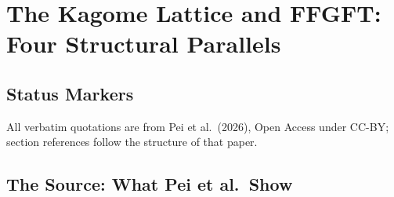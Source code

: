 
\providecommand{\BM}{\textbf{[B]}}
\providecommand{\KM}{\textbf{[K]}}
\providecommand{\SM}{\textbf{[S]}}
\providecommand{\SetzM}{\textbf{[SETZUNG]}}
\providecommand{\QM}{\textbf{[Q]}}

\chapter*{The Kagome Lattice and FFGFT: Four Structural Parallels}

\begin{abstract}
Pei, Chen, Castelnovo and Moessner (PRL~137, 106702, 31~August 2026, Open
Access) study the singly doped infinite-$U$ Hubbard model on the kagome
lattice. They find resonating-valence-bond (RVB) polarons, disorder-free
self-trapping with band mass increasing by six orders of magnitude, and a
crossover to $\sqrt{3}\times\sqrt{3}$ order in the unpolarised limit, which
they benchmark against the three-state Potts model. This document identifies
four structural parallels to FFGFT and supports each with the wording of the
source. The parallels share one algebraic root: the Frobenius automorphism
$\phi: x\mapsto x^3$ of order~3 on finite fields. A separate section states
what does \emph{not} correspond. Status of all four parallels: \SM\
(structural correspondence established, physical identification open).
\end{abstract}

\section*{Status Markers}


\noindent All verbatim quotations are from Pei et al.\ (2026), Open Access
under CC-BY; section references follow the structure of that paper.

\section{The Source: What Pei et al.\ Show}

